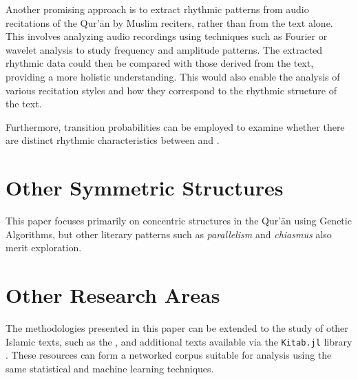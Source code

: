 Another promising approach is to extract rhythmic patterns from audio recitations of the Qur'\=an by Muslim reciters, rather than from the text alone. This involves analyzing audio recordings using techniques such as Fourier or wavelet analysis to study frequency and amplitude patterns. The extracted rhythmic data could then be compared with those derived from the text, providing a more holistic understanding. This would also enable the analysis of various recitation styles and how they correspond to the rhythmic structure of the text.

Furthermore, transition probabilities can be employed to examine whether there are distinct rhythmic characteristics between   and    \newline{}.

\section{Other Symmetric Structures}

This paper focuses primarily on concentric structures in the Qur'\=an using Genetic Algorithms, but other literary patterns such as \textit{parallelism} and \textit{chiasmus} also merit exploration.

\section{Other Research Areas}

The methodologies presented in this paper can be extended to the study of other Islamic texts, such as the  , and additional texts available via the \texttt{Kitab.jl} library \cite{al_ahmadgaid_b_asaad_kitab}. These resources can form a networked corpus suitable for analysis using the same statistical and machine learning techniques.
